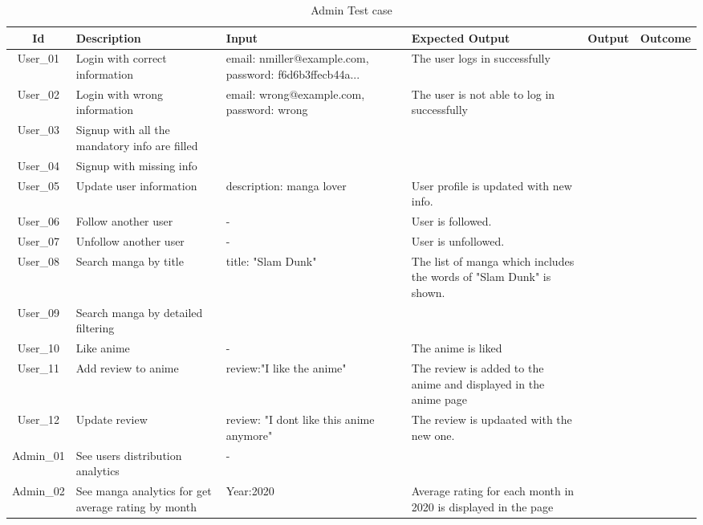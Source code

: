 \begin{table}[ht!]
    \centering
    \caption{Admin Test case}
    \begin{tabularx}{\textwidth}{|c|>{\RaggedRight}p{2.2cm}|>{\RaggedRight}X|>{\RaggedRight}p{2.7cm}|>{\RaggedRight}p{1.98cm}|>{\RaggedRight}p{1.5cm}|}
        \hline
        \textbf{Id} & \textbf{Description} & \textbf{Input} & \textbf{Expected Output} & \textbf{Output} & \textbf{Outcome} \\
        \hline
        User\_01 & Login with correct information & email: nmiller@example.com, password: f6d6b3ffecb44a... & The user logs in successfully &  &  \\
        \hline
        User\_02 & Login with wrong information  & email: wrong@example.com, password: wrong  & The user is not able to log in successfully &  &  \\
        \hline
        User\_03  & Signup with all the mandatory info are filled &  &  &  &  \\
        \hline
        User\_04  & Signup with missing info &  &  &  &  \\
        \hline
        User\_05 & Update user information & description: manga lover & User profile is updated with new info.  &  &  \\
        \hline
        User\_06 & Follow another user & - & User is followed.  &  &  \\
        \hline
        User\_07 & Unfollow another user & - & User is unfollowed. &  &  \\
        \hline
        User\_08 & Search manga by title & title: "Slam Dunk"  & The list of manga which includes the words of "Slam Dunk" is shown.  &  &  \\
        \hline
        User\_09 & Search manga by detailed filtering &  &  &  &  \\
        \hline
        User\_10 & Like anime & - & The anime is liked &  &  \\
        \hline
        User\_11 & Add review to anime & review:"I like the anime"  & The review is added to the anime and displayed in the anime page  &  &  \\
        \hline
        User\_12 & Update review & review: "I dont like this anime anymore" & The review is updaated with the new one. &  &  \\
        \hline
        Admin\_01 & See users distribution analytics   & - &  &  &  \\
        \hline
        Admin\_02 & See manga analytics for get average rating by month & Year:2020 & Average rating for each month in 2020 is displayed in the page &  &  \\

\end{tabularx}
\end{table}

